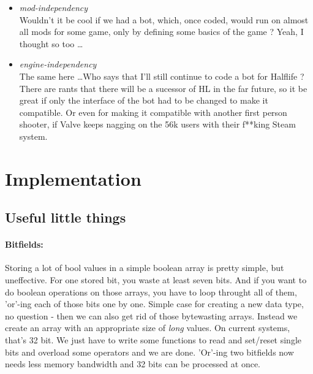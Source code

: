 \documentclass[12pt]{article}
\begin{document}
\begin {itemize}
\item \textit{mod-independency}\\
Wouldn't it be cool if we had a bot, which, once coded, would run on almost all mods for some game, only by defining some basics of the game ? Yeah, I thought so too \ldots

\item \textit{engine-independency}\\
The same here \ldots Who says that I'll still continue to code a bot for Halflife ? There are rants that there will be a sucessor of HL in the far future, so it be great if only the interface of the bot had to be changed to make it compatible. Or even for making it compatible with another first person shooter, if Valve keeps nagging on the 56k users with their f**king Steam system.

\end {itemize}

\section{Implementation}
\subsection{Useful little things}
\paragraph{Bitfields:}
Storing a lot of bool values in a simple boolean array is pretty simple, but uneffective. For one stored bit, you waste at least seven bits. And if you want to do boolean operations on those arrays, you have to loop throught all of them, 'or'-ing each of those bits one by one. Simple case for creating a new data type, no question - then we can also get rid of those bytewasting arrays. Instead we create an array with an appropriate size of \textit{long} values. On current systems, that's 32 bit. We just have to write some functions to read and set/reset single bits and overload some operators and we are done. 'Or'-ing two bitfields now needs less memory bandwidth and 32 bits can be processed at once.
\end{document}
